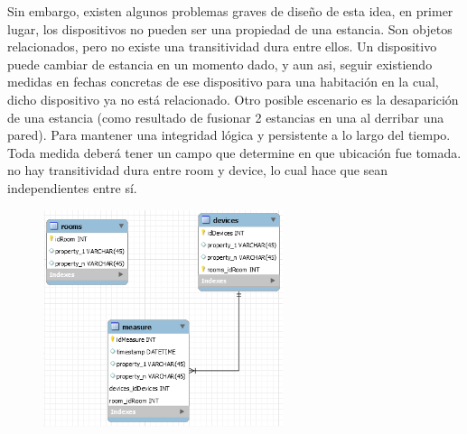 \vspace{1.5cm}

Sin embargo, existen algunos problemas graves de diseño de esta idea, en primer lugar, los dispositivos no pueden ser una propiedad de una estancia. Son objetos relacionados, pero no existe una transitividad dura entre ellos. Un dispositivo puede cambiar de estancia en un momento dado, y aun asi, seguir existiendo medidas en fechas concretas de ese dispositivo para una habitación en la cual, dicho dispositivo ya no está relacionado. Otro posible escenario es la desaparición de una estancia (como resultado de fusionar 2 estancias en una al derribar una pared). Para mantener una integridad lógica y persistente a lo largo del tiempo. Toda medida deberá tener un campo que determine en que ubicación fue tomada.
no hay transitividad dura entre room y device, lo cual hace que sean independientes entre sí.


\begin{figure}[hbt!]
\centering
\includegraphics[height=2.5in]{figures/SQLSchemaExample_2.png}
\end{figure}

\vspace{1.5cm}

